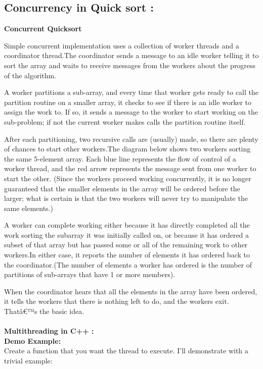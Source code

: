 \documentclass[a4paper,12pt]{article}
\begin{document}
{{	\subsection{Concurrency in Quick sort : }
		\textbf{Concurrent Quicksort} \\
		\par	Simple concurrent implementation uses a collection of worker threads and a coordinator thread.The coordinator sends a message to an idle worker telling it to sort the array and waits to receive messages from the workers about the progress of the algorithm. \par
		A worker partitions a sub-array, and every time that worker gets ready to call the partition routine on a smaller array, it checks to see if there is an idle worker to assign the work to. If so, it sends a message to the worker to start working on the sub-problem; if not the current worker makes calls the partition routine itself.
		\par	After each partitioning, two recursive calls are (usually) made, so there are plenty of chances to start other workers.The diagram below shows two workers sorting the same 5-element array. Each blue line represents the flow of control of a worker thread, and the red arrow represents the message sent from one worker to start the other. (Since the workers proceed working concurrently, it is no longer guaranteed that the smaller elements in the array will be ordered before the larger; what is certain is that the two workers will never try to manipulate the same elements.)
		\par	A worker can complete working either because it has directly completed all the work sorting the subarray it was initially called on, or because it has ordered a subset of that array but has passed some or all of the remaining work to other workers.In either case, it reports the number of elements it has ordered back to the coordinator.(The number of elements a worker has ordered is the number of partitions of sub-arrays that have 1 or more members).
		\par	When the coordinator hears that all the elements in the array have been ordered, it tells the workers that there is nothing left to do, and the workers exit. Thatâ€™s the basic idea.\\\\
		\textbf{Multithreading in C++ :}\\
		\textbf{Demo Example:} \\
		Create a function that you want the thread to execute. I'll demonstrate with a trivial example:\\
}}
\end{document}
